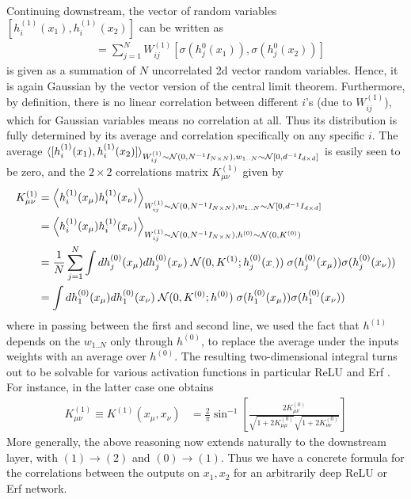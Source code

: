 Continuing downstream, the vector of random variables $[h^{(1)}_i(x_1),h^{(1)}_i(x_2)]$ can be written as 
\begin{align}
[h^{(1)}_i(x_1),h^{(1)}_i(x_2)] &= \sum_{j=1}^N W^{(1)}_{ij} [\sigma(h_j^{0}(x_1)),\sigma(h_j^{0}(x_2))]
\end{align}
is given as a summation of $N$ uncorrelated 2d vector random variables. Hence, it is again Gaussian by the vector version of the central limit theorem. Furthermore, by definition, there is no linear correlation between different $i$'s (due to $W_{ij}^{(1)}$), which for Gaussian variables means no correlation at all. Thus its distribution is fully determined by its average and correlation specifically on any specific $i$. The average $\langle [h^{(1)}_i(x_1),h^{(1)}_i(x_2)] \rangle_{W^{(1)}_{ij} \sim {\cal N}(0,N^{-1}I_{N \times N}),w_{1..N} \sim {\cal N}[0,d^{-1} I_{d\times d}]}$ is easily seen to be zero, and the $2 \times 2$ correlations matrix $K^{(1)}_{\mu \nu}$ given by 
\begin{align}
\label{Eq:NNGP_K_1}
K^{(1)}_{\mu \nu} &= \left\langle h^{(1)}_i(x_{\mu})h^{(1)}_i(x_{\nu}) \right\rangle_{W^{(1)}_{ij} \sim {\cal N}(0,N^{-1}I_{N \times N}),w_{1..N} \sim {\cal N}[0,d^{-1} I_{d\times d}] } \\ \nonumber &= \left\langle h^{(1)}_i(x_{\mu})h^{(1)}_i(x_{\nu}) \right\rangle_{W^{(1)}_{ij} \sim {\cal N}(0,N^{-1}I_{N \times N}),h^{(0)} \sim {\cal N}(0,K^{(0)})} \\ \nonumber 
&= \frac{1}{N}\sum_{j=1}^N \int d h^{(0)}_{j}(x_\mu) d h^{(0)}_{j}(x_\nu) \; {\cal N}(0,K^{(1)};h_{j}^{(0)}(x_.)) \; \sigma(h^{(0)}_j(x_{\mu}))\sigma(h^{(0)}_j(x_{\nu})) \\ \nonumber 
&= \int d h^{(0)}_1(x_\mu) d h^{(0)}_1(x_\nu) \; {\cal N}(0,K^{(0)};h^{(0)}) \; \sigma(h^{(0)}_{1}(x_{\mu})) \sigma(h^{(0)}_{1}(x_{\nu}))
\end{align} 
where in passing between the first and second line, we used the fact that $h^{(1)}$ depends on the $w_{1..N}$ only through $h^{(0)}$, to replace the average under the inputs weights with an average over $h^{(0)}$. The resulting two-dimensional integral turns out to be solvable for various activation functions in particular ReLU \citep{Saul2009,lee2017deep} and Erf \citep{williams1996computing}. For instance, in the latter case one obtains 
\begin{align}
\label{Eq:ErfKernel}
K^{(1)}_{\mu \nu}  \equiv K^{(1)}(x_{\mu},x_{\nu})  &= \frac{2}{\pi} \sin^{-1}\left[\frac{2 K^{(0)}_{\mu \nu}}{\sqrt{1+2 K^{(0)}_{\mu \mu}}\sqrt{1+2K^{(0)}_{\nu \nu}}}\right]
\end{align}
More generally, the above reasoning now extends naturally to the downstream layer, with $(1)\rightarrow(2)$ and $(0) \rightarrow (1)$. Thus we have a concrete formula for the correlations between the outputs on $x_1,x_2$ for an arbitrarily deep ReLU or Erf network. 

